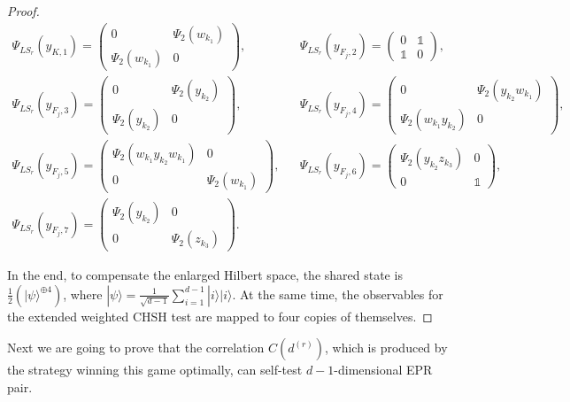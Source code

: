 \documentclass[11pt,letterpaper]{article}
\newcommand{\ket}[1]{|#1\rangle}
\newcommand{\1}{\mathbb{1}}
\newcommand{\LS}{LS}
\newcommand{\dr}[1]{d^{(#1)}}
\theoremstyle{definition}
\begin{document}
\begin{proof}
\begin{align*}
	\Psi_{\LS_r}(y_{K,1}) = 
	\begin{pmatrix}
		0 & \Psi_2(w_{k_1}) \\
		\Psi_2(w_{k_1}) & 0
	\end{pmatrix},
	&&
	\Psi_{\LS_r}(y_{F_j,2}) = 
	\begin{pmatrix}
		0 & \1\\
		\1 & 0
	\end{pmatrix},\\
	\Psi_{\LS_r}(y_{F_j,3}) = 
	\begin{pmatrix}
		0 & \Psi_2(y_{k_2}) \\
		\Psi_2(y_{k_2}) & 0
	\end{pmatrix},
	&&
	\Psi_{\LS_r}(y_{F_j,4}) = 
	\begin{pmatrix}
		0 & \Psi_2(y_{k_2}w_{k_1}) \\
		\Psi_2(w_{k_1}y_{k_2}) & 0
	\end{pmatrix},\\
	\Psi_{\LS_r}(y_{F_j,5}) = 
	\begin{pmatrix}
		 \Psi_2(w_{k_1}y_{k_2}w_{k_1}) & 0\\
		  0 & \Psi_2(w_{k_1})
	\end{pmatrix},
	&&
	\Psi_{\LS_r}(y_{F_j,6}) = 
	\begin{pmatrix}
		 \Psi_2(y_{k_2}z_{k_3}) & 0\\
		 0 & \1
	\end{pmatrix},\\
	\Psi_{\LS_r}(y_{F_j,7}) = 
	\begin{pmatrix}
		 \Psi_2(y_{k_2}) & 0\\
		 0 & \Psi_2(z_{k_3})
	\end{pmatrix}.
\end{align*}

In the end, to compensate the enlarged Hilbert space, the shared state is $\frac{1}{2}( \ket{\psi}^{\oplus 4})$,
where $\ket{\psi} = \frac{1}{\sqrt{d-1}} \sum_{i=1}^{d-1} \ket{i}\ket{i}$.
At the same time, the observables for the extended weighted CHSH test are mapped to four copies of themselves. 
\end{proof}
Next we are going to prove that the correlation $C(\dr{r})$, which is produced by the 
strategy winning this game optimally, can self-test $d-1$-dimensional EPR pair.

\end{document}
